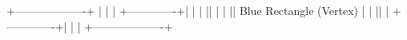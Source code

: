 +-------------------+
|                   |
|    +-------------+|
|    |             ||
|    |             || Blue Rectangle (Vertex)
|    |             ||
|    +-------------+|
|                   |
+-------------------+